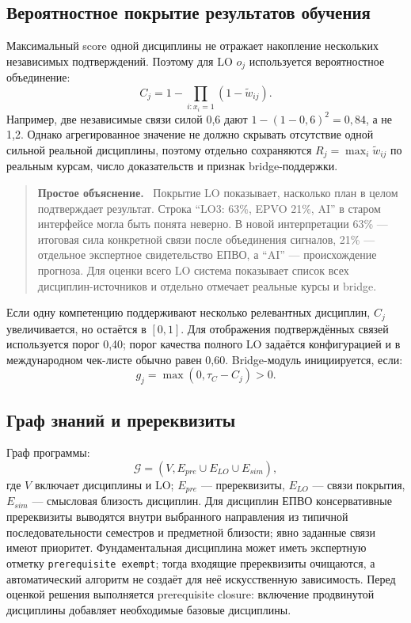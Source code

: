 \documentclass[twoside,11pt]{article}
\newcommand{\Gcal}{\mathcal{G}}
\newenvironment{plainbox}{%
  \begin{quote}\small\noindent\textbf{Простое объяснение.}\ }{%
  \end{quote}}
\begin{document}
\subsection{Вероятностное покрытие результатов обучения}

Максимальный score одной дисциплины не отражает накопление нескольких независимых подтверждений. Поэтому для LO $o_j$ используется вероятностное объединение:
\begin{equation}
  C_j=1-\prod_{i:x_i=1}(1-\tilde w_{ij}).
  \label{eq:prob-coverage}
\end{equation}
Например, две независимые связи силой 0,6 дают
$1-(1-0,6)^2=0,84$, а не 1,2. Однако агрегированное значение не должно скрывать
отсутствие одной сильной реальной дисциплины, поэтому отдельно сохраняются
$R_j=\max_i \tilde w_{ij}$ по реальным курсам, число доказательств и признак
bridge-поддержки.

\begin{plainbox}
Покрытие LO показывает, насколько план в целом подтверждает результат.
Строка ``LO3: 63\%, EPVO 21\%, AI'' в старом интерфейсе могла быть понята
неверно. В новой интерпретации 63\% --- итоговая сила конкретной связи после
объединения сигналов, 21\% --- отдельное экспертное свидетельство ЕПВО, а
``AI'' --- происхождение прогноза. Для оценки всего LO система показывает
список всех дисциплин-источников и отдельно отмечает реальные курсы и bridge.
\end{plainbox}
Если одну компетенцию поддерживают несколько релевантных дисциплин, $C_j$ увеличивается, но остаётся в $[0,1]$. Для отображения подтверждённых связей используется порог 0,40; порог качества полного LO задаётся конфигурацией и в международном чек-листе обычно равен 0,60. Bridge-модуль инициируется, если:
\begin{equation}
  g_j=\max(0,\tau_C-C_j)>0.
  \label{eq:gap}
\end{equation}

\subsection{Граф знаний и пререквизиты}

Граф программы:
\begin{equation}
  \Gcal=(V,E_{pre}\cup E_{LO}\cup E_{sim}),
  \label{eq:graph}
\end{equation}
где $V$ включает дисциплины и LO; $E_{pre}$ --- пререквизиты, $E_{LO}$ --- связи покрытия, $E_{sim}$ --- смысловая близость дисциплин. Для дисциплин ЕПВО консервативные пререквизиты выводятся внутри выбранного направления из типичной последовательности семестров и предметной близости; явно заданные связи имеют приоритет. Фундаментальная дисциплина может иметь экспертную отметку \texttt{prerequisite exempt}; тогда входящие пререквизиты очищаются, а автоматический алгоритм не создаёт для неё искусственную зависимость. Перед оценкой решения выполняется prerequisite closure: включение продвинутой дисциплины добавляет необходимые базовые дисциплины.
\end{document}
